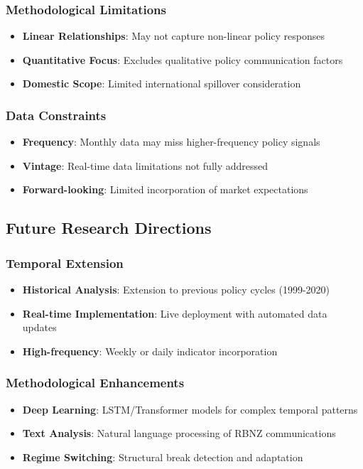 \documentclass[11pt,a4paper]{article}
\begin{document}
	\subsubsection{Methodological Limitations}
	\begin{itemize}
		\item \textbf{Linear Relationships}: May not capture non-linear policy responses
		\item \textbf{Quantitative Focus}: Excludes qualitative policy communication factors
		\item \textbf{Domestic Scope}: Limited international spillover consideration
	\end{itemize}
	
	\subsubsection{Data Constraints}
	\begin{itemize}
		\item \textbf{Frequency}: Monthly data may miss higher-frequency policy signals
		\item \textbf{Vintage}: Real-time data limitations not fully addressed
		\item \textbf{Forward-looking}: Limited incorporation of market expectations
	\end{itemize}
	
	\subsection{Future Research Directions}
	
	\subsubsection{Temporal Extension}
	\begin{itemize}
		\item \textbf{Historical Analysis}: Extension to previous policy cycles (1999-2020)
		\item \textbf{Real-time Implementation}: Live deployment with automated data updates
		\item \textbf{High-frequency}: Weekly or daily indicator incorporation
	\end{itemize}
	
	\subsubsection{Methodological Enhancements}
	\begin{itemize}
		\item \textbf{Deep Learning}: LSTM/Transformer models for complex temporal patterns
		\item \textbf{Text Analysis}: Natural language processing of RBNZ communications
		\item \textbf{Regime Switching}: Structural break detection and adaptation
	\end{itemize}
	
\end{document}
